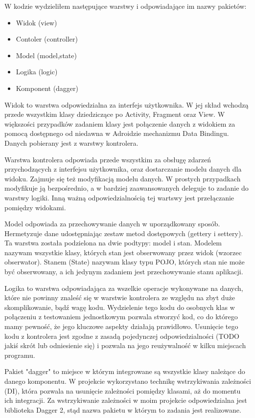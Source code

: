 \documentclass	{xmgr}
\begin{document}
W kodzie wydzieliłem następujące warstwy i odpowiadające im nazwy pakietów:
\begin{itemize}
	\item Widok (view)
	\item Contoler (controller)
	\item Model (model,state)
	\item Logika (logic)
	\item Komponent (dagger)
\end{itemize}

Widok to warstwa odpowiedzialna za interfejs użytkownika. W jej skład wchodzą przede wszystkim klasy dziedziczące po Activity, Fragment oraz View. W większości przypadków zadaniem klasy jest połączenie danych z widokiem za pomocą dostępnego od niedawna w Adroidzie mechanizmu Data Bindingu. Danych pobierany jest z warstwy kontrolera.

Warstwa kontrolera odpowiada przede wszystkim za obsługę zdarzeń przychodzących z interfejsu użytkownika, oraz dostarczanie modelu danych dla widoku. Zajmuje się też modyfikacją modelu danych. W prostych przypadkach modyfikuje ją bezpośrednio, a w bardziej zaawansowanych deleguje to zadanie do warstwy logiki. Inną ważną odpowiedzialnością tej wartswy jest przełączanie pomiędzy widokami. 

Model odpowiada za przechowywanie danych w uporządkowany sposób. Hermetyzuje dane udostępniając zestaw metod dostępowych (gettery i settery). Ta warstwa została podzielona na dwie podtypy: model i stan. Modelem nazywam wszystkie klasy, których stan jest obserwowany przez widok (wzorzec obserwator). Stanem (State) nazywam klasy typu POJO, których stan nie może być obserwowany, a ich jedynym zadaniem jest przechowywanie stanu aplikacji. 

Logika to warstwa odpowiadająca za wszelkie operacje wykonywane na danych, które nie powinny znaleść się w warstwie kontrolera ze względu na zbyt duże skomplikowanie, bądź wagę kodu. Wydzielenie tego kodu do osobnych klas w połączeniu z testowaniem jednostkowym pozwala stworzyć kod, co do którego mamy pewność, że jego kluczowe aspekty działają prawidłowo. Usunięcie tego kodu z kontrolera jest zgodne z zasadą pojedynczej odpowiedzialności (TODO jakiś skrót lub odniesienie się) i pozwala na jego reużywalność w kilku miejscach programu. 

Pakiet "dagger" to miejsce w którym integrowane są wszystkie klasy należące do danego komponentu. W projekcie wykorzystano technikę wstrzykiwania zależności (DI), która pozwala na usunięcie zależności pomiędzy klasami, aż do momentu ich integracji. Za wstrzykiwanie zależności w moim projekcie odpowiedzialna jest biblioteka Dagger 2, stąd nazwa pakietu w którym to zadania jest realizowane.
\end{document}
